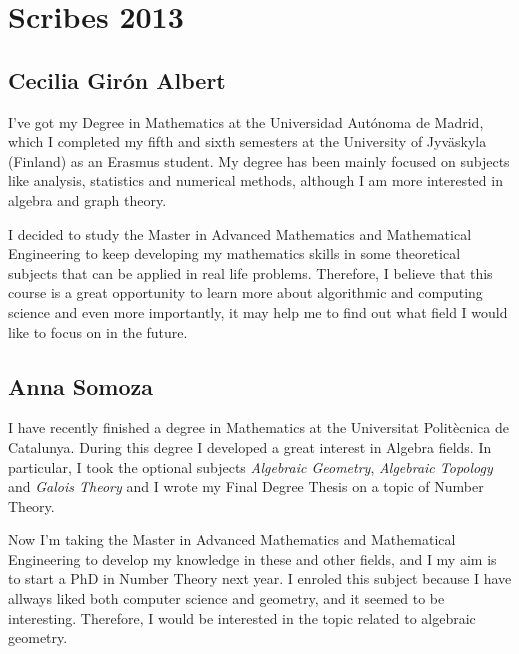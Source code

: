 \chapter*{Scribes 2013}

\section{Cecilia Girón Albert}

I've got my Degree in Mathematics at the Universidad Autónoma de Madrid, which I completed my fifth and sixth semesters 
at the University of Jyväskyla (Finland) as an Erasmus student. My degree has been mainly focused on subjects like 
analysis, statistics and numerical methods, although I am more interested in algebra and graph theory. 

I decided to study the Master in Advanced Mathematics and Mathematical Engineering to keep developing my mathematics skills 
in some theoretical subjects that can be applied in real life problems. Therefore, I believe that this course is a great 
opportunity to learn more about algorithmic and computing science and even more importantly, it may help me to find out 
what field I would like to focus on in the future.

\section{Anna Somoza}

I have recently finished a degree in Mathematics at the Universitat Politècnica de Catalunya. During this degree I developed a great interest in Algebra fields. In particular, I took the optional subjects \emph{Algebraic Geometry}, \emph{Algebraic Topology} and \emph{Galois Theory} and I wrote my Final Degree Thesis on a topic of Number Theory.

Now I'm taking the Master in Advanced Mathematics and Mathematical Engineering to develop my knowledge in these and other fields, and I my aim is to start a PhD in Number Theory next year. I enroled this subject because I have allways liked both computer science and geometry, and it seemed to be interesting. Therefore, I would be interested in the topic related to algebraic geometry.



